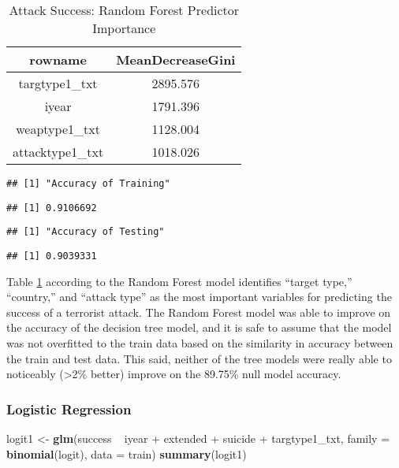 \documentclass[11pt,letterpaper,]{article}
\newenvironment{Shaded}{\begin{snugshade}}{\end{snugshade}}
\newcommand{\KeywordTok}[1]{\textcolor[rgb]{0.13,0.29,0.53}{\textbf{{#1}}}}
\newcommand{\DataTypeTok}[1]{\textcolor[rgb]{0.13,0.29,0.53}{{#1}}}
\newcommand{\StringTok}[1]{\textcolor[rgb]{0.31,0.60,0.02}{{#1}}}
\newcommand{\NormalTok}[1]{{#1}}
\theoremstyle{definition}
\theoremstyle{definition}
\theoremstyle{definition}
\theoremstyle{remark}
\begin{document}
\begin{table}

\caption{\label{tab:succimprf}Attack Success: Random Forest Predictor Importance}
\centering
\begin{tabular}[t]{cc}
\toprule
rowname & MeanDecreaseGini\\
\midrule
targtype1\_txt & 2895.576\\
iyear & 1791.396\\
weaptype1\_txt & 1128.004\\
attacktype1\_txt & 1018.026\\
\bottomrule
\end{tabular}
\end{table}

\begin{verbatim}
## [1] "Accuracy of Training"
\end{verbatim}

\begin{verbatim}
## [1] 0.9106692
\end{verbatim}

\begin{verbatim}
## [1] "Accuracy of Testing"
\end{verbatim}

\begin{verbatim}
## [1] 0.9039331
\end{verbatim}

Table \ref{tab:succimprf} according to the Random Forest model
identifies ``target type,'' ``country,'' and ``attack type'' as the most
important variables for predicting the success of a terrorist attack.
The Random Forest model was able to improve on the accuracy of the
decision tree model, and it is safe to assume that the model was not
overfitted to the train data based on the similarity in accuracy between
the train and test data. This said, neither of the tree models were
really able to noticeably (\textgreater{}2\% better) improve on the
89.75\% null model accuracy.

\subsubsection{Logistic Regression}\label{logistic-regression}

\begin{Shaded}
\begin{Highlighting}[]
\NormalTok{logit1 <-}\StringTok{ }\KeywordTok{glm}\NormalTok{(success ~}\StringTok{ }\NormalTok{iyear +}\StringTok{ }\NormalTok{extended +}\StringTok{ }\NormalTok{suicide +}\StringTok{ }\NormalTok{targtype1_txt, }\DataTypeTok{family =} \KeywordTok{binomial}\NormalTok{(logit), }\DataTypeTok{data =} \NormalTok{train)}
\KeywordTok{summary}\NormalTok{(logit1)}
\end{Highlighting}
\end{Shaded}
\end{document}
